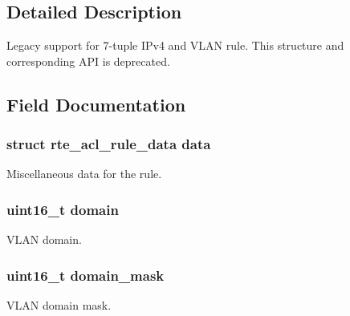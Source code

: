 \subsection{Detailed Description}
Legacy support for 7-\/tuple I\+Pv4 and V\+L\+A\+N rule. This structure and corresponding A\+P\+I is deprecated. 

\subsection{Field Documentation}
\hypertarget{structrte__acl__ipv4vlan__rule_a99051b6359c64a7d62ba690eb050c203}{}
\subsubsection[{data}]{\setlength{\rightskip}{0pt plus 5cm}struct {\bf rte\+\_\+acl\+\_\+rule\+\_\+data} data}\label{structrte__acl__ipv4vlan__rule_a99051b6359c64a7d62ba690eb050c203}
Miscellaneous data for the rule. \hypertarget{structrte__acl__ipv4vlan__rule_a71f5a95cafc58280f7afe1de6dfd98a2}{}
\subsubsection[{domain}]{\setlength{\rightskip}{0pt plus 5cm}uint16\+\_\+t domain}\label{structrte__acl__ipv4vlan__rule_a71f5a95cafc58280f7afe1de6dfd98a2}
V\+L\+A\+N domain. \hypertarget{structrte__acl__ipv4vlan__rule_a6c8cf15b815bc8e583473ff09b25e02f}{}
\subsubsection[{domain\+\_\+mask}]{\setlength{\rightskip}{0pt plus 5cm}uint16\+\_\+t domain\+\_\+mask}\label{structrte__acl__ipv4vlan__rule_a6c8cf15b815bc8e583473ff09b25e02f}
V\+L\+A\+N domain mask. \hypertarget{structrte__acl__ipv4vlan__rule_ad3367f6b5057b9c73b012338e5a437ae}{}
